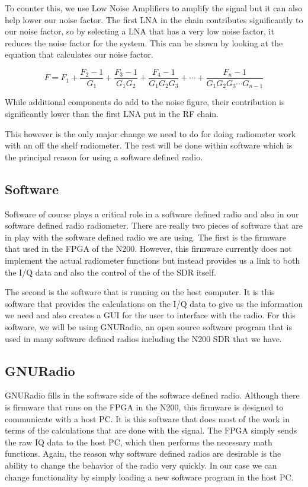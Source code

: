 To counter this, we use Low Noise Amplifiers to amplify the signal but it can also help lower our noise factor.  The first LNA in the chain contributes significantly to our noise factor, so by selecting a LNA that has a very low noise factor, it reduces the noise factor for the system.  This can be shown by looking at the equation that calculates our noise factor.

\begin{equation}\label{noise_factor}
F=F_1+\frac{F_2-1}{G_1}+\frac{F_3-1}{G_1 G_2}+\frac{F_4-1}{G_1 G_2 G_3}+\cdots +\frac{F_n-1}{G_1 G_2 G_3 \cdots G_{n-1}}
\end{equation}

While additional components do add to the noise figure, their contribution is significantly lower than the first LNA put in the RF chain.

This however is the only major change we need to do for doing radiometer work with an off the shelf radiometer.  The rest will be done within software which is the principal reason for using a software defined radio.

\subsection{Software}
Software of course plays a critical role in a software defined radio and also in our software defined radio radiometer.  There are really two pieces of software that are in play with the software defined radio we are using.  The first is the firmware that used in the FPGA of the N200.  However, this firmware currently does not implement the actual radiometer functions but instead provides us a link to both the I/Q data and also the control of the of the SDR itself.  

The second is the software that is running on the host computer.  It is this software that provides the calculations on the I/Q data to give us the information we need and also creates a GUI for the user to interface with the radio.  For this software, we will be using GNURadio, an open source software program that is used in many software defined radios including the N200 SDR that we have.

\subsection{GNURadio}

GNURadio fills in the software side of the software defined radio.  Although there is firmware that runs on the FPGA in the N200, this firmware is designed to communicate with a host PC.  It is this software that does most of the work in terms of the calculations that are done with the signal.  The FPGA simply sends the raw IQ data to the host PC, which then performs the necessary math functions.  Again, the reason why software defined radios are desirable is the ability to change the behavior of the radio very quickly.  In our case we can change functionality by simply loading a new software program in the host PC.  

